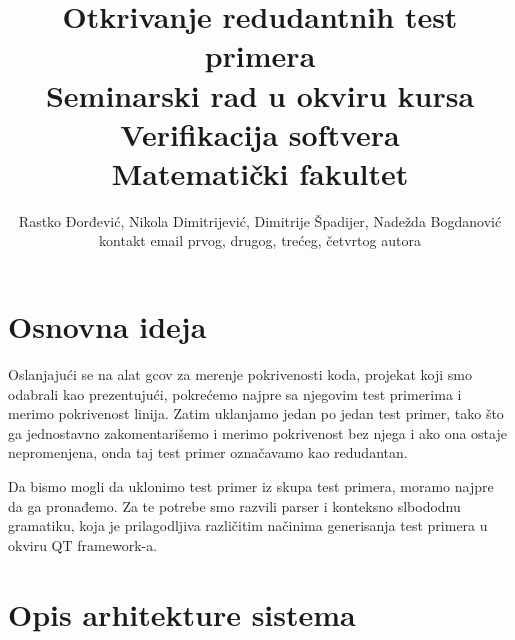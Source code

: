 \documentclass[a4paper]{article}
\theoremstyle{definition}
\begin{document}
\title{Otkrivanje redudantnih test primera\\ \small{Seminarski rad u okviru kursa\\Verifikacija softvera\\ Matematički fakultet}}

\author{Rastko Đorđević, Nikola Dimitrijević, Dimitrije Špadijer, Nadežda Bogdanović\\ kontakt email prvog, drugog, trećeg, četvrtog autora}


\maketitle


\tableofcontents

\newpage

\section{Osnovna ideja}
\label{sec:osnovnaideja}

Oslanjajući se na alat gcov za merenje pokrivenosti koda, projekat koji smo odabrali kao prezentujući, pokrećemo najpre sa njegovim test primerima i merimo pokrivenost linija. Zatim uklanjamo jedan po jedan test primer, tako što ga jednostavno zakomentarišemo i merimo pokrivenost bez njega i ako ona ostaje nepromenjena, onda taj test primer označavamo kao redudantan.

Da bismo mogli da uklonimo test primer iz skupa test primera, moramo najpre da ga pronađemo. Za te potrebe smo razvili parser i konteksno slbododnu gramatiku, koja je prilagodljiva različitim načinima generisanja test primera u okviru QT framework-a.

\section{Opis arhitekture sistema}
\label{sec:arhitektura}
\end{document}
